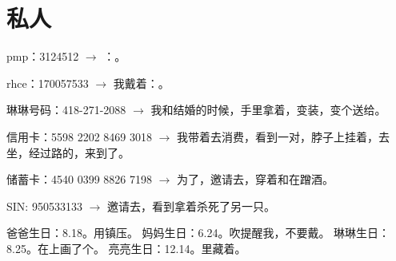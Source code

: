 
\chapter{私人}

pmp：3124512 \(\longrightarrow\) ：。

rhce：170057533 \(\longrightarrow\) 我戴着：。

琳琳号码：418-271-2088 \(\longrightarrow\) 我和结婚的时候，手里拿着，变装，变个送给。

信用卡：5598 2202 8469 3018 \(\rightarrow\) 我带着去消费，看到一对，脖子上挂着，去坐，经过路的，来到了。

储蓄卡：4540 0399 8826 7198 \(\rightarrow\) 为了，邀请去，穿着和在蹭酒。

SIN: 950533133 \(\rightarrow\) 邀请去，看到拿着杀死了另一只。

爸爸生日：8.18。用镇压。
妈妈生日：6.24。吹提醒我，不要戴。
琳琳生日：8.25。在上画了个。
亮亮生日：12.14。里藏着。

